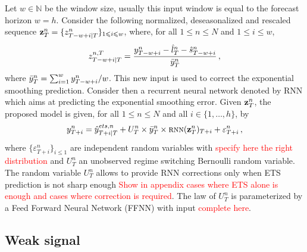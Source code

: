 \documentclass[letterpaper]{article} %
\newcommand{\ts}{y}
\newcommand{\tspred}{\hat{\ts}}
\newcommand{\lvl}{\hat{l}}
\newcommand{\seas}{\hat{s}}
\newcommand{\lag}{h}
\newcommand{\window}{w}
\newcommand{\etspred}{\hat{y}}
\newcommand{\meants}{\Bar{\ts}}
\newcommand{\rnnwindow}{{\bf \rnn}}
\newcommand{\rnn}{z}
\newcommand{\err}{err}
\newcommand{\rnnmodel}{\textsc{rnn}}
\begin{document}
Let $\window \in \mathbb{N}$ be the window size, usually this input window is equal to the forecast horizon $\window = \lag$. Consider the following  normalized, deseasonalized and rescaled sequence $\rnnwindow^n_T = \{\rnn^{n}_{T-\window+i|T}\}_{1\leqslant i \leqslant w}$, where, for all $1\leqslant n \leqslant N$ and $1\leqslant i \leqslant w$, 
$$
\rnn^{n,T}_{T-w+i|T} = \frac{\ts^n_{T-w+i} - \lvl^n_T - \seas^n_{T-w+i}}{\meants^n_T}\,,
$$
where $ \meants^n_T = \sum_{i = 1}^{w}  \ts^n_{T-w+i}/w$. This new input is used to correct the exponential smoothing prediction. %
Consider then a recurrent neural network denoted by RNN which aims at predicting the exponential smoothing error. Given $\rnnwindow^n_T$, the proposed model is given, for all $1\leqslant n \leqslant N$ and all $i \in \{1,\ldots,\lag\}$, by
$$
\ts^n_{T+i}  = \etspred^{ets,n}_{T+i|T} +  U^n_T\times\meants^n_T\times \rnnmodel(\rnnwindow^n_T)_{T+i} + \varepsilon^n_{T+i}\,,%
$$
where $\{\varepsilon^n_{T+i}\}_{i\leqslant 1}$ are independent random variables with \textcolor{red}{specify here the right distribution} and $U^n_T$ an unobserved regime switching Bernoulli random variable. The random variable $U^n_T$ allows to provide RNN corrections only when ETS prediction is not sharp enough \textcolor{red}{Show in appendix cases where ETS alone is enough and cases where correction is required}. The law of $U^n_T$ is parameterized by a Feed Forward Neural Network (FFNN) with input \textcolor{red}{complete here}.

\subsection{Weak signal}
\end{document}
